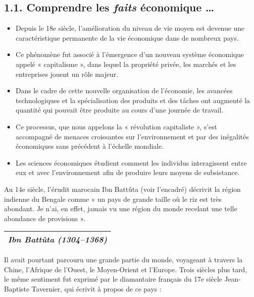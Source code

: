 \documentclass[11pt]{amsart}
\begin{document}
\hypertarget{x-1.1.-comprendre-les-\emph{faits}-économique-…​}{\subsection*{1.1. Comprendre les \emph{faits} économique …​}}
\begin{itemize}

\item Depuis le 18e siècle, l’amélioration du niveau de vie moyen est devenue une caractéristique permanente de la vie économique dans de nombreux pays.

\item Ce phénomène fut associé à l’émergence d’un nouveau système économique appelé « capitalisme », dans lequel la propriété privée, les marchés et les entreprises jouent un rôle majeur.

\item Dans le cadre de cette nouvelle organisation de l’économie, les avancées technologiques et la spécialisation des produits et des tâches ont augmenté la quantité qui pouvait être produite au cours d’une journée de travail.

\item Ce processus, que nous appelons la « révolution capitaliste », s’est accompagné de menaces croissantes sur l’environnement et par des inégalités économiques sans précédent à l’échelle mondiale.

\item Les sciences économiques étudient comment les individus interagissent entre eux et avec l’environnement afin de produire leurs moyens de subsistance.

\end{itemize}


Au 14e siècle, l’érudit marocain Ibn Battûta (voir l’encadré) décrivit la région indienne du Bengale comme « un pays de grande taille où le riz est très abondant. Je n’ai, en effet, jamais vu une région du monde recelant une telle abondance de provisions ».


\begin{center}
\begin{tabular}{|c|}
\hline
\emph{Ibn Battûta (1304–1368)} \\ 
\hline
\end{tabular}
\end{center}

Il avait pourtant parcouru une grande partie du monde, voyageant à travers la Chine, l’Afrique de l’Ouest, le Moyen-Orient et l’Europe. Trois siècles plus tard, le même sentiment fut exprimé par le diamantaire français du 17e siècle Jean-Baptiste Tavernier, qui écrivit à propos de ce pays :
\end{document}
